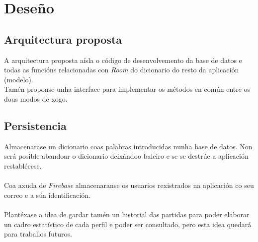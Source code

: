 \chapter{Deseño}
\label{chap:deseño}
\section {Arquitectura proposta}
A arquitectura proposta aísla o código de desenvolvemento da base de datos e todas as funcións relacionadas con \textit{Room} do dicionario do resto da aplicación (modelo).\\
Tamén proponse unha interface para implementar os métodos en común entre os dous modos de xogo.


\section {Persistencia}
Almacenarase un dicionario coas palabras introducidas nunha base de datos. Non será posible abandoar o dicionario deixándoo baleiro e se se destrúe a aplicación restablécese. \\
\\
Coa axuda de \textit{Firebase} almacenaranse os usuarios rexistrados na aplicación co seu correo e a súa identificación. \\
\\
Plantéxase a idea de gardar tamén un historial das partidas para poder elaborar un cadro estatístico de cada perfil e poder ser consultado, pero esta idea quedará para traballos futuros.

